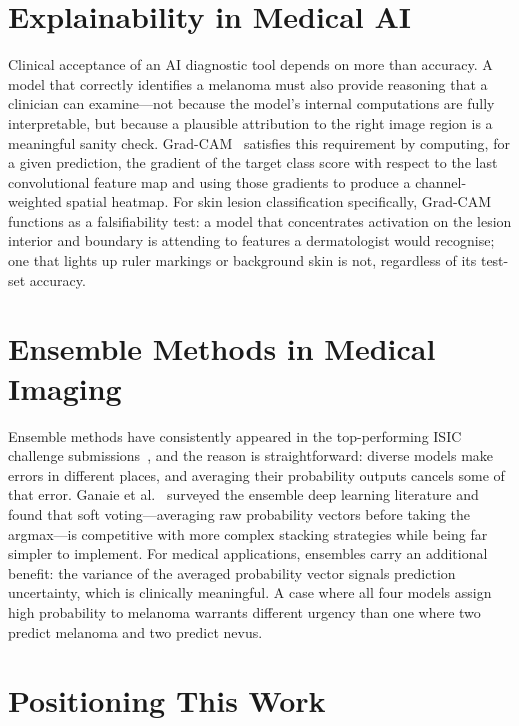 \documentclass[11pt,a4paper]{report}
\begin{document}
\section{Explainability in Medical AI}

Clinical acceptance of an AI diagnostic tool depends on more than accuracy. A model that correctly identifies a melanoma must also provide reasoning that a clinician can examine---not because the model's internal computations are fully interpretable, but because a plausible attribution to the right image region is a meaningful sanity check. Grad-CAM~\cite{selvaraju2017grad} satisfies this requirement by computing, for a given prediction, the gradient of the target class score with respect to the last convolutional feature map and using those gradients to produce a channel-weighted spatial heatmap. For skin lesion classification specifically, Grad-CAM functions as a falsifiability test: a model that concentrates activation on the lesion interior and boundary is attending to features a dermatologist would recognise; one that lights up ruler markings or background skin is not, regardless of its test-set accuracy.

\section{Ensemble Methods in Medical Imaging}

Ensemble methods have consistently appeared in the top-performing ISIC challenge submissions~\cite{codella2019skin}, and the reason is straightforward: diverse models make errors in different places, and averaging their probability outputs cancels some of that error. Ganaie et al.~\cite{ganaie2022ensemble} surveyed the ensemble deep learning literature and found that soft voting---averaging raw probability vectors before taking the argmax---is competitive with more complex stacking strategies while being far simpler to implement. For medical applications, ensembles carry an additional benefit: the variance of the averaged probability vector signals prediction uncertainty, which is clinically meaningful. A case where all four models assign high probability to melanoma warrants different urgency than one where two predict melanoma and two predict nevus.

\section{Positioning This Work}
\end{document}
